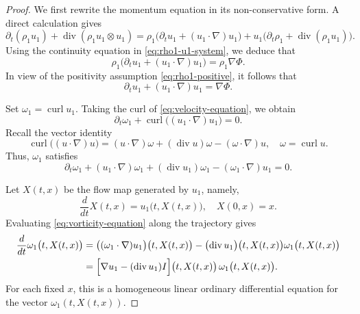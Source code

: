 \documentclass[10pt,reqno]{amsart}
\numberwithin{equation}{section}
\begin{document}
\begin{proof}
	We first rewrite the momentum equation in its non-conservative
	form. A direct calculation gives
\[ 
		\partial_t(\rho_1u_1)
		+\operatorname{div}(\rho_1u_1\otimes u_1)
		=\rho_1\bigl(\partial_tu_1+(u_1\cdot\nabla)u_1\bigr)
		+u_1\bigl(\partial_t\rho_1
		+\operatorname{div}(\rho_1u_1)\bigr).
\]
	Using the continuity equation in
	\eqref{eq:rho1-u1-system}, we deduce that
\[ 
		\rho_1\bigl(\partial_tu_1+(u_1\cdot\nabla)u_1\bigr)
		=\rho_1\nabla\Phi.
\] 
	In view of the positivity assumption \eqref{eq:rho1-positive},
	it follows that
	\begin{equation}
		\partial_tu_1+(u_1\cdot\nabla)u_1=\nabla\Phi.
		\label{eq:velocity-equation}
	\end{equation}
	
	Set  $\omega_1=\operatorname{curl}u_1$.
	Taking the curl of \eqref{eq:velocity-equation}, we obtain
\[ 
		\partial_t\omega_1
		+\operatorname{curl}\bigl((u_1\cdot\nabla)u_1\bigr)=0.
\] 
	Recall the vector identity
\[ 
		\operatorname{curl}\bigl((u\cdot\nabla)u\bigr)
		=(u\cdot\nabla)\omega
		+(\operatorname{div}u)\omega
		-(\omega\cdot\nabla)u,
		\quad
		\omega=\operatorname{curl}u.
\] 
	Thus, $\omega_1$ satisfies
	\begin{equation}
		\partial_t\omega_1
		+(u_1\cdot\nabla)\omega_1
		+(\operatorname{div}u_1)\omega_1
		-(\omega_1\cdot\nabla)u_1=0.
		\label{eq:vorticity-equation}
	\end{equation}
	
	
	Let $X(t,x)$ be the flow map generated by $u_1$, namely,
\[%
		\frac{d}{dt}X(t,x)=u_1\bigl(t,X(t,x)\bigr),
		\quad X(0,x)=x.
\]%
	Evaluating \eqref{eq:vorticity-equation} along the trajectory gives
	\begin{align}\label{eq:vorticity-characteristic-1}
		\frac{d}{dt}\omega_1\bigl(t,X(t,x)\bigr)
		&=\bigl((\omega_1\cdot\nabla)u_1\bigr)\bigl(t,X(t,x)\bigr)
		-\bigl(\operatorname{div}u_1\bigr)\bigl(t,X(t,x)\bigr)
		\omega_1\bigl(t,X(t,x)\bigr)\notag\\
		&=\Bigl[\nabla u_1-(\operatorname{div}u_1)I\Bigr]
		\bigl(t,X(t,x)\bigr)\,
		\omega_1\bigl(t,X(t,x)\bigr).
	\end{align}
	For each fixed $x$, this is a homogeneous linear ordinary differential equation for the vector
	$\omega_1(t,X(t,x))$.
	

\end{proof}
\end{document}
